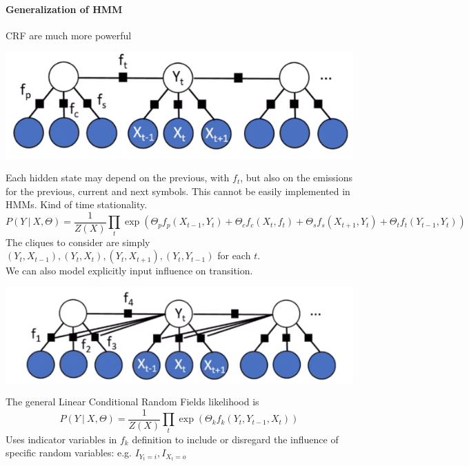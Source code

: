 \documentclass[10pt]{report}
\begin{document}
\paragraph{Generalization of HMM} CRF are much more powerful\begin{center}
	\includegraphics[scale=0.4]{37.png}
\end{center}
Each hidden state may depend on the previous, with $f_t$, but also on the emissions for the previous, current and next symbols. This cannot be easily implemented in HMMs. Kind of time stationality.
$$P(Y\:|\:X,\Theta) = \frac{1}{Z(X)}\prod_t \exp\left(\Theta_pf_p(X_{t-1},Y_t) + \Theta_cf_c(X_t,f_t) + \Theta_sf_s(X_{t+1},Y_t)+\Theta_tf_t(Y_{t-1},Y_t)\right)$$
The cliques to consider are simply $(Y_t, X_{t-1}), (Y_t, X_{t}), (Y_t, X_{t+1}), (Y_t, Y_{t-1})$ for each $t$.\\
We can also model explicitly input influence on transition.
\begin{center}
	\includegraphics[scale=0.5]{38.png}
\end{center}
The general Linear Conditional Random Fields likelihood is
$$P(Y\:|\:X,\Theta)=\frac{1}{Z(X)}\prod_t\exp\left(\Theta_kf_k(Y_t,Y_{t-1},X_t)\right)$$
Uses indicator variables in $f_k$ definition to include or disregard the influence of specific random variables: e.g. $I_{Y_t=i}, I_{X_t=o}$
\end{document}
